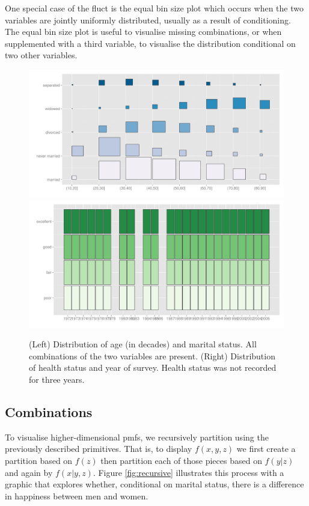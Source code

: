 \documentclass[letterpaper,oneside]{scrartcl}
\begin{document}
One special case of the fluct is the equal bin size plot which occurs when the two variables are jointly uniformly distributed, usually as a result of conditioning. The equal bin size plot is useful to visualise missing combinations, or when supplemented with a third variable, to visualise the distribution conditional on two other variables.

\begin{figure}[htbp]
  \centering
    \includegraphics[width=0.5\linewidth]{part-fluct}%
    \includegraphics[width=0.5\linewidth]{part-fluct-cond}
  \caption{(Left) Distribution of age (in decades) and marital status.  All combinations of the two variables are present. (Right) Distribution of health status and year of survey. Health status was not recorded for three years.}
  \label{fig:fluct}
\end{figure}

\subsection{Combinations}
\label{sub:part-nd}

To visualise higher-dimensional pmfs, we recursively partition using the previously described primitives. That is, to display $f(x, y, z)$ we first create a partition based on $f(z)$ then partition each of those pieces based on $f(y | z)$ and again by $f(x | y, z)$. Figure \ref{fig:recursive} illustrates this process with a graphic that explores whether, conditional on marital status, there is a difference in happiness between men and women.  

\end{document}
